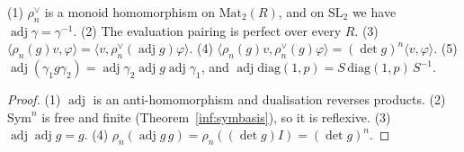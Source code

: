 \begin{theorem}\label{prop:pairing}
  \leanok
  (1) $\rho_n^\vee$ is a monoid homomorphism on $\mathrm{Mat}_2(R)$, and on $\mathrm{SL}_2$ we have $\operatorname{adj}\gamma=\gamma^{-1}$.
  (2) The evaluation pairing is perfect over every $R$.
  (3) $\langle\rho_n(g)v,\varphi\rangle=\langle v,\rho_n^\vee(\operatorname{adj}g)\varphi\rangle$.
  (4) $\langle\rho_n(g)v,\rho_n^\vee(g)\varphi\rangle=(\det g)^n\langle v,\varphi\rangle$.
  (5) $\operatorname{adj}(\gamma_1g\gamma_2)=\operatorname{adj}\gamma_2\operatorname{adj}g\operatorname{adj}\gamma_1$, and
  $\operatorname{adj}\mathrm{diag}(1,p)=S\,\mathrm{diag}(1,p)\,S^{-1}$.
\end{theorem}
\begin{proof}
  \leanok
  (1) $\operatorname{adj}$ is an anti-homomorphism and dualisation reverses products. (2) $\mathrm{Sym}^n$ is free and
  finite (Theorem~\ref{inf:symbasis}), so it is reflexive. (3) $\operatorname{adj}\operatorname{adj}g=g$.
  (4) $\rho_n(\operatorname{adj}g\,g)=\rho_n((\det g)I)=(\det g)^n$.
\end{proof}

